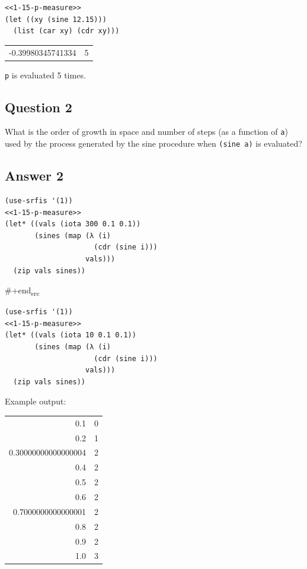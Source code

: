 \documentclass[final,fleqn,titlepage]{article}
\begin{document}
\begin{verbatim}
<<1-15-p-measure>>
(let ((xy (sine 12.15)))
  (list (car xy) (cdr xy)))
\end{verbatim}

\begin{center}
\begin{tabular}{rr}
-0.39980345741334 & 5\\
\end{tabular}
\end{center}

\texttt{p} is evaluated 5 times.

\subsection{Question 2}
\label{sec:orgbcce443}
What is the order of growth in space and number of steps (as a function of \texttt{a})
used by the process generated by the sine procedure when \texttt{(sine a)} is
evaluated?

\subsection{Answer 2}
\label{sec:orgb7899ff}
\begin{verbatim}
(use-srfis '(1))
<<1-15-p-measure>>
(let* ((vals (iota 300 0.1 0.1))
       (sines (map (λ (i)
                     (cdr (sine i)))
                   vals)))
  (zip vals sines))
\end{verbatim}
\#+end\textsubscript{src}
\begin{verbatim}
(use-srfis '(1))
<<1-15-p-measure>>
(let* ((vals (iota 10 0.1 0.1))
       (sines (map (λ (i)
                     (cdr (sine i)))
                   vals)))
  (zip vals sines))
\end{verbatim}

Example output:
\begin{center}
\begin{tabular}{rr}
0.1 & 0\\
0.2 & 1\\
0.30000000000000004 & 2\\
0.4 & 2\\
0.5 & 2\\
0.6 & 2\\
0.7000000000000001 & 2\\
0.8 & 2\\
0.9 & 2\\
1.0 & 3\\
\end{tabular}
\end{center}
\end{document}
